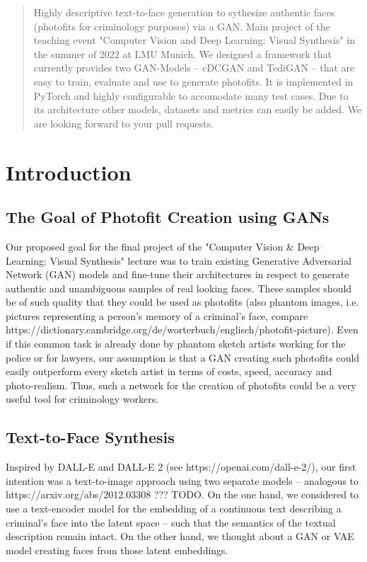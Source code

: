 \documentclass[12pt, a4paper]{article}
\begin{document}
\begin{abstract}
Highly descriptive text-to-face generation to sythesize authentic faces (photofits for criminology purposes) via a GAN. Main project of the  teaching event "Computer Vision and Deep Learning: Visual Synthesis" in the summer of 2022 at LMU Munich.
We designed a framework that currently provides two GAN-Models -- cDCGAN and TediGAN -- that are easy to train, evaluate and use to generate photofits. It is implemented in PyTorch and highly configurable to accomodate many test cases. Due to its architecture other models, datasets and metrics can easily be added. We are looking forward to your pull requests.


\cite[]{celebA}
\end{abstract}
\tableofcontents

\section{Introduction}

\subsection{The Goal of Photofit Creation using GANs}
Our proposed goal for the final project of the "Computer Vision \& Deep Learning: Visual Synthesis" lecture was to train 
existing Generative Adversarial Network (GAN) models and fine-tune their architectures in respect to generate authentic
and unambiguous samples of real looking faces. These samples should be of such quality that they could be used as
photofits (also phantom images, i.e. pictures representing a person's memory of a criminal's face, compare 
https://dictionary.cambridge.org/de/worterbuch/englisch/photofit-picture). Even if this common task is already done
by phantom sketch artists working for the police or for lawyers, our assumption is that a GAN creating such photofits
could easily outperform every sketch artist in terms of costs, speed, accuracy and photo-realism. Thus, such a network
for the creation of photofits could be a very useful tool for criminology workers.

\subsection{Text-to-Face Synthesis}
Inspired by DALL-E and DALL-E 2 (see https://openai.com/dall-e-2/), our first intention was a text-to-image approach
using two separate models -- analogous to https://arxiv.org/abs/2012.03308 ??? TODO. On the one hand, we considered to
use a text-encoder model for the embedding of a continuous text describing a criminal's face into the latent space --
such that the semantics of the textual description remain intact. On the other hand, we thought about a GAN or VAE model
creating faces from those latent embeddings.
\end{document}

